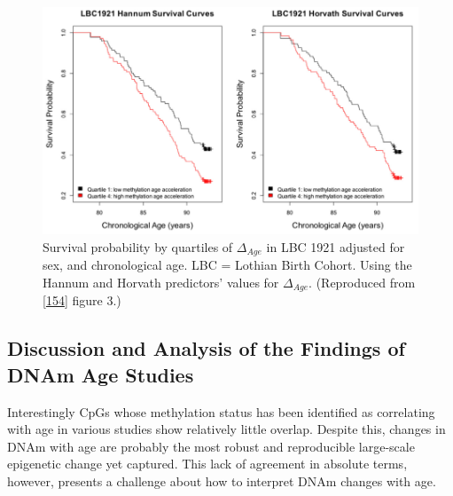 \documentclass[
]{book}
\begin{document}
\begin{figure}

{\centering \includegraphics[width=0.8\linewidth]{figs/Marioni2015f3} 

}

\caption{Survival probability by quartiles of \(\Delta_{Age}\) in LBC 1921 adjusted for sex, and chronological age. LBC = Lothian Birth Cohort. Using the Hannum and Horvath predictors' values for \(\Delta_{Age}\). (Reproduced from {[}\protect\hyperlink{ref-Marioni2015}{154}{]} figure 3.)}\label{fig:Marioni2015f3}
\end{figure}



\hypertarget{discussion-and-analysis-of-the-findings-of-dnam-age-studies}{%
\subsection{Discussion and Analysis of the Findings of DNAm Age Studies}\label{discussion-and-analysis-of-the-findings-of-dnam-age-studies}}

Interestingly CpGs whose methylation status has been identified as correlating with age in various studies show relatively little overlap. Despite this, changes in DNAm with age are probably the most robust and reproducible large-scale epigenetic change yet captured.
This lack of agreement in absolute terms, however, presents a challenge about how to interpret DNAm changes with age.
\end{document}
